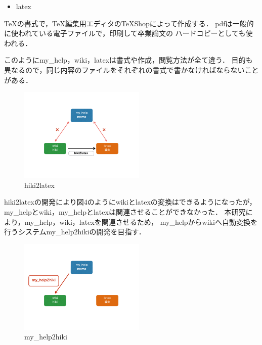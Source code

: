 \begin{itemize}
\item latex
\end{itemize}
\begin{description}
\item TeXの書式で，TeX編集用エディタのTeXShopによって作成する．
pdfは一般的に使われている電子ファイルで，印刷して卒業論文の
ハードコピーとしても使われる．
\end{description}

このようにmy\_help，wiki，latexは書式や作成，閲覧方法が全て違う．
目的も異なるので，同じ内容のファイルをそれぞれの書式で書かなければならないことがある．

\begin{figure}[htbp]\begin{center}
\includegraphics[width=6cm,bb=100 100 600 700]{my_help2hiki_saki.004.png}
\caption{ hiki2latex}
\label{default}\end{center}\end{figure}
hiki2latexの開発により図4のようにwikiとlatexの変換はできるようになったが，
my\_helpとwiki，my\_helpとlatexは関連させることができなかった．
本研究により，my\_help，wiki，latexを関連させるため，
my\_helpからwikiへ自動変換を行うシステムmy\_help2hikiの開発を目指す．

\begin{figure}[htbp]\begin{center}
\includegraphics[width=6cm,bb=0 0 442 500]{my_help2hiki_saki.005.png}
\caption{my\_help2hiki}
\label{default}\end{center}\end{figure}